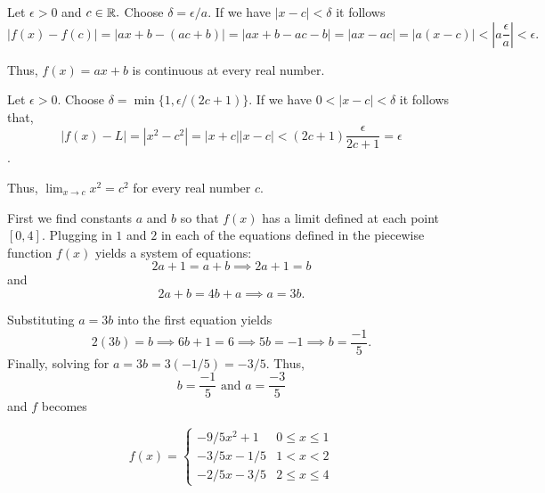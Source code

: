\documentclass{report}
\begin{document}
\pagebreak
{}


\begin{myproof}
    Let $\epsilon >0$ and $c \in \RR.$ Choose $\delta = \epsilon/a.$ If we have $ |x-c|< \delta$ it follows $$ |f(x) - f(c)| = |ax +b - (ac+b)| = | ax + b -ac - b | = |ax -ac| = |a(x-c)| < |a \frac{\epsilon}{a} | < \epsilon.$$

Thus, $f(x)=a x+b$ is continuous at every real number.
\end{myproof}


\begin{myproof}
  Let $\epsilon > 0.$ Choose $\delta = \min\{1, \epsilon/(2c+1)\}$. If we have $0 < |x-c| < \delta$ it follows that, $$|f(x) - L| = |x^2 - c^2| = |x + c||x-c| < (2c+1)\frac{\epsilon}{2c+1} = \epsilon$$.

Thus, $\lim _{x \rightarrow c} x^2=c^2$ for every real number $c$.
\end{myproof}


\pagebreak
{}
\bigskip
\sol

First we find constants $a$ and $b$ so that $f(x)$ has a limit defined at each point $[0,4].$ Plugging in $1$ and $2$ in each of the equations defined in the piecewise function $f(x)$ yields a system of equations:$$ 2a +1 = a + b \implies 2a +1 = b$$
and $$2a +b = 4b + a \implies a = 3b.$$

Substituting $a = 3b$ into the first equation yields $$2(3b) = b \implies 6b + 1 =6 \implies 5b = -1 \implies b = \frac{-1}{5}.$$ Finally, solving for $a = 3b = 3 (-1/5) = -3/5.$ Thus, $$ b = \frac{-1}{5} \text { and } a = \frac{-3}{5} $$ and $f$ becomes


$$
f(x)=\left\{\begin{array}{cc}
-9/5 x^2+1 & 0 \leq x \leq 1 \\
-3/5 x - 1/5 & 1<x<2 \\
-2/5 x - 3/5 & 2 \leq x \leq 4
\end{array}\right.
$$
\end{document}

